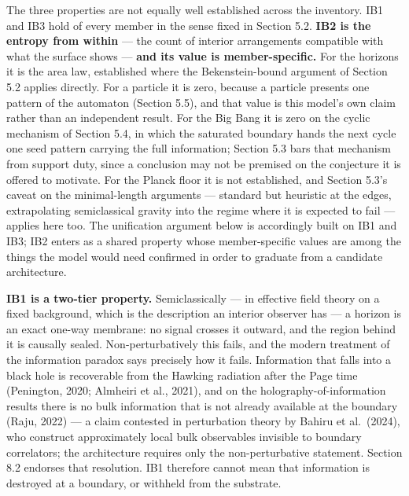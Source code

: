 \documentclass[
]{article}
\begin{document}
The three properties are not equally well established across the
inventory. IB1 and IB3 hold of every member in the sense fixed in
Section 5.2. \textbf{IB2 is the entropy from within} --- the count of
interior arrangements compatible with what the surface shows ---
\textbf{and its value is member-specific.} For the horizons it is the
area law, established where the Bekenstein-bound argument of Section 5.2
applies directly. For a particle it is zero, because a particle presents
one pattern of the automaton (Section 5.5), and that value is this
model's own claim rather than an independent result. For the Big Bang it
is zero on the cyclic mechanism of Section 5.4, in which the saturated
boundary hands the next cycle one seed pattern carrying the full
information; Section 5.3 bars that mechanism from support duty, since a
conclusion may not be premised on the conjecture it is offered to
motivate. For the Planck floor it is not established, and Section 5.3's
caveat on the minimal-length arguments --- standard but heuristic at the
edges, extrapolating semiclassical gravity into the regime where it is
expected to fail --- applies here too. The unification argument below is
accordingly built on IB1 and IB3; IB2 enters as a shared property whose
member-specific values are among the things the model would need
confirmed in order to graduate from a candidate architecture.

\textbf{IB1 is a two-tier property.} Semiclassically --- in effective
field theory on a fixed background, which is the description an interior
observer has --- a horizon is an exact one-way membrane: no signal
crosses it outward, and the region behind it is causally sealed.
Non-perturbatively this fails, and the modern treatment of the
information paradox says precisely how it fails. Information that falls
into a black hole is recoverable from the Hawking radiation after the
Page time (Penington, 2020; Almheiri et al., 2021), and on the
holography-of-information results there is no bulk information that is
not already available at the boundary (Raju, 2022) --- a claim contested
in perturbation theory by Bahiru et al.~(2024), who construct
approximately local bulk observables invisible to boundary correlators;
the architecture requires only the non-perturbative statement. Section
8.2 endorses that resolution. IB1 therefore cannot mean that information
is destroyed at a boundary, or withheld from the substrate.
\end{document}
